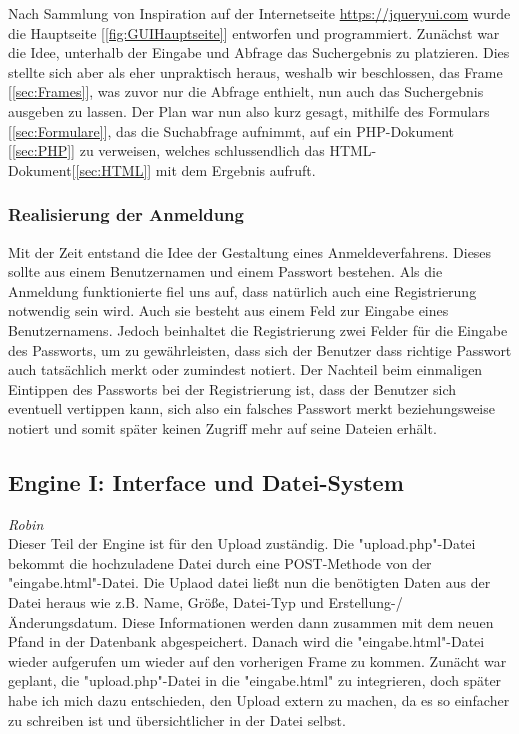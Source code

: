 \documentclass[12pt,a4paper,bibliography=totocnumbered,listof=totocnumbered]{scrartcl}
\begin{document}
Nach Sammlung von Inspiration auf der Internetseite \url{https://jqueryui.com} wurde die Hauptseite [\ref{fig:GUIHauptseite}] entworfen und programmiert. Zunächst war die Idee, unterhalb der Eingabe und Abfrage das Suchergebnis zu platzieren. Dies stellte sich aber als eher unpraktisch heraus, weshalb wir beschlossen, das Frame [\ref{sec:Frames}], was zuvor nur die Abfrage enthielt, nun auch das Suchergebnis ausgeben zu lassen. Der Plan war nun also kurz gesagt, mithilfe des Formulars [\ref{sec:Formulare}], das die Suchabfrage aufnimmt, auf ein PHP-Dokument [\ref{sec:PHP}] zu verweisen, welches schlussendlich das HTML-Dokument[\ref{sec:HTML}] mit dem Ergebnis aufruft. \\

\subsubsection{Realisierung der Anmeldung}
\label{RealisierungAnmeldung}
Mit der Zeit entstand die Idee der Gestaltung eines Anmeldeverfahrens. Dieses sollte aus einem Benutzernamen und einem Passwort bestehen. Als die Anmeldung funktionierte fiel uns auf, dass natürlich auch eine Registrierung notwendig sein wird. Auch sie besteht aus einem Feld zur Eingabe eines Benutzernamens. Jedoch beinhaltet die Registrierung zwei Felder für die Eingabe des Passworts, um zu gewährleisten, dass sich der Benutzer dass richtige Passwort auch tatsächlich merkt oder zumindest notiert. Der Nachteil beim einmaligen Eintippen des Passworts bei der Registrierung ist, dass der Benutzer sich eventuell vertippen kann, sich also ein falsches Passwort merkt beziehungsweise notiert und somit später keinen Zugriff mehr auf seine Dateien erhält.

\subsection{Engine I: Interface und Datei-System}
\emph{Robin}\\
Dieser Teil der Engine ist für den Upload zuständig. Die "upload.php"-Datei bekommt die hochzuladene Datei durch eine POST-Methode von der "eingabe.html"-Datei. Die Uplaod datei ließt nun die benötigten Daten aus der Datei heraus wie z.B. Name, Größe, Datei-Typ und Erstellung-/Änderungsdatum. Diese Informationen werden dann zusammen mit dem neuen Pfand in der Datenbank abgespeichert. Danach wird die "eingabe.html"-Datei wieder aufgerufen um wieder auf den vorherigen Frame zu kommen.
Zunächt war geplant, die "upload.php"-Datei in die "eingabe.html" zu integrieren, doch später habe ich mich dazu entschieden, den Upload extern zu machen, da es so einfacher zu schreiben ist und übersichtlicher in der Datei selbst.
\end{document}
